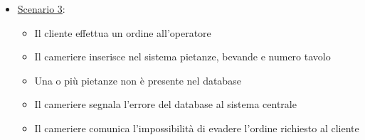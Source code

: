 \begin{enumerate}
\begin{itemize}
\begin{itemize}
\begin{itemize}
                \item Il cameriere comunica l'impossibilit\`a di evadere l'ordine richiesto al cliente
            \end{itemize}
            \item \uline{Scenario 3}:
            \begin{itemize}
                \item Il cliente effettua un ordine all'operatore
                \item Il cameriere inserisce nel sistema pietanze, bevande e numero tavolo
                \item Una o pi\`u pietanze non \`e presente nel database
                \item Il cameriere segnala l'errore del database al sistema centrale
                \item Il cameriere comunica l'impossibilit\`a di evadere l'ordine richiesto al cliente
            \end{itemize}
        \end{itemize}
    \end{itemize}


\end{enumerate}
